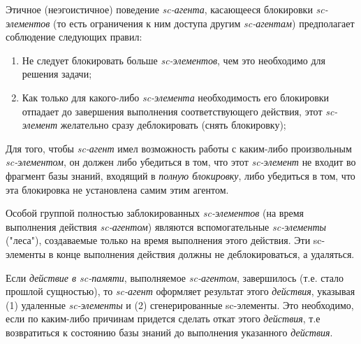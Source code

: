 \begin{textitemize}
	Этичное (неэгоистичное) поведение \textit{sc-агента}, касающееся блокировки \textit{sc-элементов} (то есть ограничения к ним доступа другим \textit{sc-агентам}) предполагает соблюдение следующих правил:
	\begin{enumerate}
		\item Не следует блокировать больше \textit{sc-элементов}, чем это необходимо для решения задачи;
		\item Как только для какого-либо \textit{sc-элемента} необходимость его блокировки отпадает до завершения выполнения соответствующего действия, этот \textit{sc-элемент} желательно сразу деблокировать (снять блокировку);
	\end{enumerate}
	
	Для того, чтобы \textit{sc-агент} имел возможность работы с каким-либо произвольным \textit{sc-элементом}, он должен либо убедиться в том, что этот \textit{sc-элемент} не входит во фрагмент базы знаний, входящий в \textit{полную блокировку}, либо убедиться в том, что эта блокировка не установлена самим этим агентом.
	
	Особой группой полностью заблокированных \textit{sc-элементов} (на время выполнения действия \textit{\mbox{sc-агентом}}) являются вспомогательные \textit{sc-элементы} ("леса"{}), создаваемые только на время выполнения этого действия. Эти sc-элементы в конце выполнения действия должны не деблокироваться, а удаляться.
	
	\item Если \textit{действие в sc-памяти}, выполняемое \textit{sc-агентом}, завершилось (т.е. стало прошлой сущностью), то \textit{sc-агент} оформляет результат этого \textit{действия}, указывая (1) удаленные \textit{sc-элементы} и (2) сгенерированные sc-элементы. Это необходимо, если по каким-либо причинам придется сделать откат этого \textit{действия}, т.е возвратиться к состоянию базы знаний до выполнения указанного \textit{действия}.
\end{textitemize}

